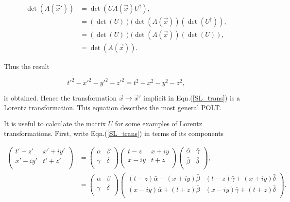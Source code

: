 \begin{align*}  
\det(A(\vec{x}')) & = \det(U A(\vec{x}) U^{\dagger}), \\
                  & = (\det(U))(\det(A(\vec{x}))(\det(U^{\dagger})), \\
                  & = (\det(U))(\det(A(\vec{x}))(\det(U)), \\
                  & = \det(A(\vec{x})).
\end{align*}

\noindent Thus the result

\begin{equation*}  
{t'}^2 - {x'}^2 - {y'}^2 - {z'}^2 = {t}^2 - {x}^2 - {y}^2 - {z}^2,
\end{equation*}

\noindent is obtained. Hence the transformation $\vec{x} \rightarrow \vec{x}'$ implicit in Eqn.(\ref{SL_trans}) is a Lorentz transformation. This equation describes the most general POLT.

It is useful to calculate the matrix $U$ for some examples of Lorentz transformations. First, write Eqn.(\ref{SL_trans}) in terms of its components

\begin{align*} 
\left(
\begin{array}{cc}
t' - z' & x' + i y' \\
x' - i y' & t' + z' \\
\end{array}
\right)
& =
\left(
\begin{array}{cc}
\alpha & \beta \\
\gamma & \delta \\
\end{array}
\right)
\left(
\begin{array}{cc}
t-z & x + i y \\
x - i y & t + z   \\
\end{array}
\right)
\left(
\begin{array}{cc}
\bar{\alpha} & \bar{\gamma} \\
\bar{\beta} & \bar{\delta} \\
\end{array}
\right), \\
& = \left(
\begin{array}{cc}
\alpha & \beta \\
\gamma & \delta \\
\end{array}
\right)
\left(
\begin{array}{cc}
(t-z)\bar{\alpha} + (x + iy)\bar{\beta} & (t-z)\bar{\gamma} + (x + iy)\bar{\delta} \\
(x - iy)\bar{\alpha} + (t+z)\bar{\beta} & (x-iy)\bar{\gamma} + (t+z)\bar{\delta} \\
\end{array}
\right).
\end{align*}

